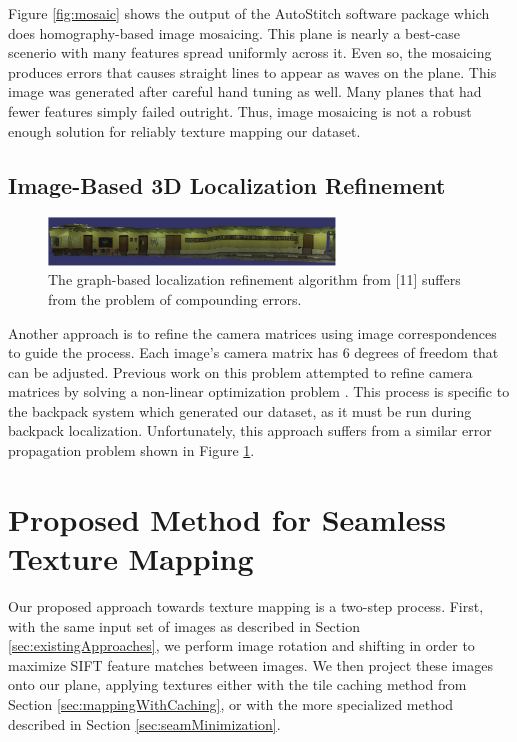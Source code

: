 \documentclass[10pt,twocolumn,letterpaper]{article}
\begin{document}
Figure \ref{fig:mosaic} shows the output of the AutoStitch software
package which does homography-based image mosaicing. This plane is
nearly a best-case scenerio with many features spread uniformly across
it. Even so, the mosaicing produces errors that causes straight lines
to appear as waves on the plane. This image was generated after
careful hand tuning as well. Many planes that had fewer features
simply failed outright. Thus, image mosaicing is not a robust enough
solution for reliably texture mapping our dataset.

\subsection{Image-Based 3D Localization Refinement}
\label{sec:imageBased3DRefinement}
\begin{figure}
  \centering
  \includegraphics[width=3in]{Graph_crop.pdf}
  \caption{The graph-based localization refinement algorithm from [11]
    suffers from the problem of compounding errors. }
  \label{fig:graph}
\end{figure}

Another approach is to refine the camera matrices using image
correspondences to guide the process. Each image's camera matrix has 6
degrees of freedom that can be adjusted. Previous work on this problem
attempted to refine camera matrices by solving a non-linear
optimization problem \cite{liu2010indoor}. This process is specific to
the backpack system which generated our dataset, as it must be run
during backpack
localization\cite{liu2010indoor,chen2010indoor}. Unfortunately, this
approach suffers from a similar error propagation problem shown in
Figure \ref{fig:graph}.

\section{Proposed Method for Seamless Texture Mapping}
\label{sec:proposedApproach}
Our proposed approach towards texture mapping is a two-step
process. First, with the same input set of images as described in
Section \ref{sec:existingApproaches}, we perform image rotation and
shifting in order to maximize SIFT feature matches between images. We
then project these images onto our plane, applying textures either
with the tile caching method from Section
\ref{sec:mappingWithCaching}, or with the more specialized method
described in Section \ref{sec:seamMinimization}.
\end{document}
